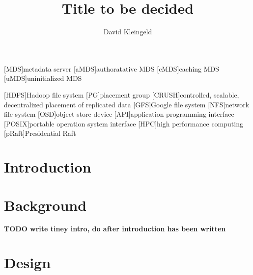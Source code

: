 \documentclass[lang=en, hanging-titles=true]{skrapport}
\title{Title to be decided}
\author{David Kleingeld}
\begin{document}
\begin{titlepage}
\maketitle
\end{titlepage}
\tableofcontents
\clearpage

\newcommand{\zookeeper}{ZooKeeper}
\newcommand{\raft}{Raft}
\newcommand{\paxos}{Paxos}
\newcommand{\multipaxos}{Multi-Paxos}
\newcommand{\ceph}{Ceph}
\newcommand{\zab}{Zab}

\newcommand{\name}{my system}
\newcommand{\Name}{My system}

\newcommand{\textacro}[1]{\small{#1}}
\begin{acronym}
	[\textacro{MDS}]{metadata server}
	[\textacro{aMDS}]{authoratative MDS}
	[\textacro{cMDS}]{caching MDS}
	[\textacro{uMDS}]{uninitialized MDS}

	[\textacro{HDFS}]{Hadoop file system}
	[\textacro{PG}]{placement group}
	[\textacro{CRUSH}]{controlled, scalable, decentralized placement of replicated data}
	[\textacro{GFS}]{Google file system}
	[\textacro{NFS}]{network file system}
	[\textacro{OSD}]{object store device}
	[\textacro{API}]{application programming interface}
	[\textacro{POSIX}]{portable operation system interface}
	[\textacro{HPC}]{high performance computing}
	[\textacro{pRaft}]{Presidential Raft}
\end{acronym}



\section{Introduction} \label{sec:intro}
 

\section{Background}
\textbf{TODO write tiney intro, do after introduction has been written}






\acresetall{}
\section{Design}



\clearpage
\appendix
\printbibliography
\end{document}
